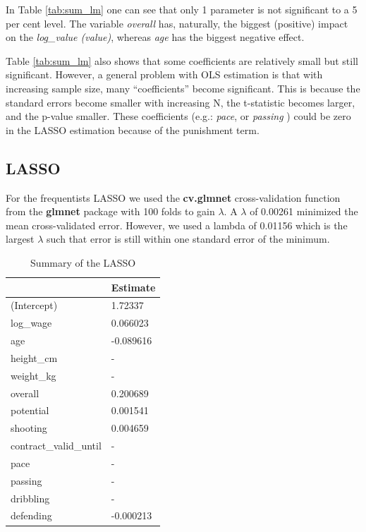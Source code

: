 \documentclass[12pt,a4paper]{article}
\begin{document}
In Table \ref{tab:sum_lm} one can see that only 1 parameter is not
significant to a 5 per cent level. The variable \emph{overall} has,
naturally, the biggest (positive) impact on the \emph{log\_value
(value)}, whereas \emph{age} has the biggest negative effect.

Table \ref{tab:sum_lm} also shows that some coefficients are relatively
small but still significant. However, a general problem with \ac{OLS}
estimation is that with increasing sample size, many
\enquote{coefficients} become significant. This is because the standard
errors become smaller with increasing N, the t-statistic becomes larger,
and the p-value smaller. These coefficients (e.g.: \emph{pace}, or
\emph{passing} ) could be zero in the \ac{LASSO} estimation because of
the punishment term.

\hypertarget{section-1}{%
\subsection{\texorpdfstring{\acf{LASSO}}{}}\label{section-1}}

For the frequentists \ac{LASSO} we used the \textbf{cv.glmnet}
cross-validation function from the \textbf{glmnet} package with 100
folds to gain \(\lambda\). A \(\lambda\) of 0.00261 minimized the mean
cross-validated error. However, we used a lambda of 0.01156 which is the
largest \(\lambda\) such that error is still within one standard error
of the minimum. \textcite{hastle_glmnet_2019}

\begin{table}[!h]

\caption{\label{tab:unnamed-chunk-4}\label{tab:sum_lasso} Summary of the LASSO }
\centering
\begin{tabular}[t]{ll}
\toprule
  & Estimate\\
\midrule
\rowcolor{gray!6}  (Intercept) & 1.72337\\
log\_wage & 0.066023\\
\rowcolor{gray!6}  age & -0.089616\\
height\_cm & -\\
\rowcolor{gray!6}  weight\_kg & -\\
overall & 0.200689\\
\rowcolor{gray!6}  potential & 0.001541\\
shooting & 0.004659\\
\rowcolor{gray!6}  contract\_valid\_until & -\\
pace & -\\
\rowcolor{gray!6}  passing & -\\
dribbling & -\\
\rowcolor{gray!6}  defending & -0.000213\\
\bottomrule
\end{tabular}
\end{table}
\end{document}
